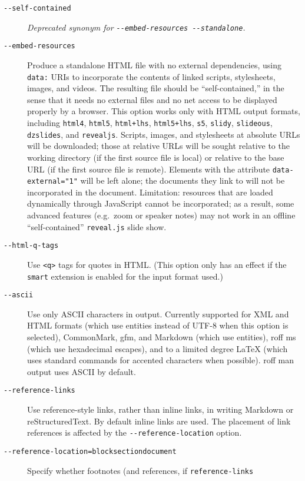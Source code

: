 \begin{description}
\item[\texttt{-\/-self-contained}]
\emph{Deprecated synonym for
\texttt{-\/-embed-resources\ -\/-standalone}.}
\item[\texttt{-\/-embed-resources}]
Produce a standalone HTML file with no external dependencies, using
\texttt{data:} URIs to incorporate the contents of linked scripts,
stylesheets, images, and videos. The resulting file should be
``self-contained,'' in the sense that it needs no external files and no
net access to be displayed properly by a browser. This option works only
with HTML output formats, including \texttt{html4}, \texttt{html5},
\texttt{html+lhs}, \texttt{html5+lhs}, \texttt{s5}, \texttt{slidy},
\texttt{slideous}, \texttt{dzslides}, and \texttt{revealjs}. Scripts,
images, and stylesheets at absolute URLs will be downloaded; those at
relative URLs will be sought relative to the working directory (if the
first source file is local) or relative to the base URL (if the first
source file is remote). Elements with the attribute
\texttt{data-external="1"} will be left alone; the documents they link
to will not be incorporated in the document. Limitation: resources that
are loaded dynamically through JavaScript cannot be incorporated; as a
result, some advanced features (e.g.~zoom or speaker notes) may not work
in an offline ``self-contained'' \texttt{reveal.js} slide show.
\item[\texttt{-\/-html-q-tags}]
Use \texttt{\textless{}q\textgreater{}} tags for quotes in HTML. (This
option only has an effect if the \texttt{smart} extension is enabled for
the input format used.)
\item[\texttt{-\/-ascii}]
Use only ASCII characters in output. Currently supported for XML and
HTML formats (which use entities instead of UTF-8 when this option is
selected), CommonMark, gfm, and Markdown (which use entities), roff ms
(which use hexadecimal escapes), and to a limited degree LaTeX (which
uses standard commands for accented characters when possible). roff man
output uses ASCII by default.
\item[\texttt{-\/-reference-links}]
Use reference-style links, rather than inline links, in writing Markdown
or reStructuredText. By default inline links are used. The placement of
link references is affected by the \texttt{-\/-reference-location}
option.
\item[\texttt{-\/-reference-location=block}\textbar{}\texttt{section}\textbar{}\texttt{document}]
Specify whether footnotes (and references, if \texttt{reference-links}

\end{description}
